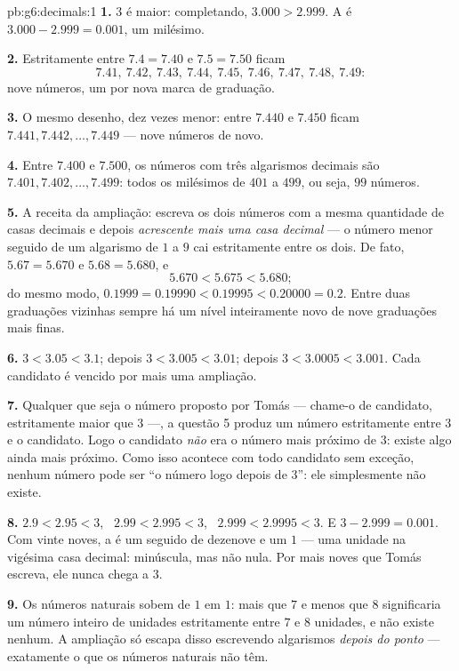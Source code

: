 \begin{solution}{pb:g6:decimals:1}
\textbf{1.} $3$ é maior: completando, $3.000 > 2.999$. A  é
$3.000 - 2.999 = 0.001$, um milésimo.

\textbf{2.} Estritamente entre $7.4 = 7.40$ e $7.5 = 7.50$ ficam
\[
7.41,\ 7.42,\ 7.43,\ 7.44,\ 7.45,\ 7.46,\ 7.47,\ 7.48,\ 7.49 :
\]
nove números, um por nova marca de graduação.

\textbf{3.} O mesmo desenho, dez vezes menor: entre $7.440$ e $7.450$
ficam $7.441, 7.442, \dots, 7.449$ --- nove números de novo.

\textbf{4.} Entre $7.400$ e $7.500$, os números com três algarismos
decimais são $7.401, 7.402, \dots, 7.499$: todos os milésimos de $401$
a $499$, ou seja, $99$ números.

\textbf{5.} A receita da ampliação: escreva os dois números com a mesma
quantidade de casas decimais e depois \emph{acrescente mais uma casa
decimal} --- o número menor seguido de um algarismo de $1$ a $9$ cai
estritamente entre os dois. De fato, $5.67 = 5.670$ e $5.68 = 5.680$,
e
\[
5.670 < 5.675 < 5.680 ;
\]
do mesmo modo, $0.1999 = 0.19990 < 0.19995 < 0.20000 = 0.2$. Entre duas
graduações vizinhas sempre há um nível inteiramente novo de nove
graduações mais finas.

\textbf{6.} $3 < 3.05 < 3.1$; depois $3 < 3.005 < 3.01$; depois
$3 < 3.0005 < 3.001$. Cada candidato é vencido por mais uma ampliação.

\textbf{7.} Qualquer que seja o número proposto por Tomás --- chame-o
de candidato, estritamente maior que $3$ ---, a questão 5 produz um
número estritamente entre $3$ e o candidato. Logo o candidato
\emph{não} era o número mais próximo de $3$: existe algo ainda mais
próximo. Como isso acontece com todo candidato sem exceção, nenhum
número pode ser ``o número logo depois de $3$'': ele simplesmente não
existe.

\textbf{8.} $2.9 < 2.95 < 3$, \ $2.99 < 2.995 < 3$, \
$2.999 < 2.9995 < 3$. E $3 - 2.999 = 0.001$. Com vinte noves, a
 é um  seguido de dezenove  e um $1$ --- uma
unidade na vigésima casa decimal: minúscula, mas não nula. Por mais
noves que Tomás escreva, ele nunca chega a $3$.

\textbf{9.} Os números naturais sobem de $1$ em $1$: mais que $7$ e
menos que $8$ significaria um número inteiro de unidades estritamente
entre $7$ e $8$ unidades, e não existe nenhum. A ampliação só escapa
disso escrevendo algarismos \emph{depois do ponto} --- exatamente o que
os números naturais não têm.


\end{solution}
